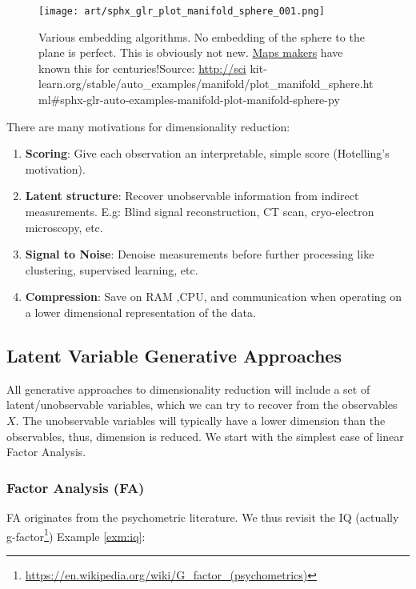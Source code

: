 \documentclass[]{book}
\theoremstyle{definition}
\theoremstyle{definition}
\theoremstyle{definition}
\theoremstyle{remark}
\begin{document}
\begin{figure}
\centering
\texttt{[image: art/sphx\_glr\_plot\_manifold\_sphere\_001.png]}
\caption{Various embedding algorithms. No embedding of the sphere to the
plane is perfect. This is obviously not new.
\href{https://en.wikipedia.org/wiki/Map_projection}{Maps makers} have
known this for centuries!Source: \url{http://sci}
kit-learn.org/stable/auto\_examples/manifold/plot\_manifold\_sphere.html\#sphx-glr-auto-examples-manifold-plot-manifold-sphere-py}
\end{figure}

There are many motivations for dimensionality reduction:

\begin{enumerate}
\def\labelenumi{\arabic{enumi}.}
\item
  \textbf{Scoring}: Give each observation an interpretable, simple score
  (Hotelling's motivation).
\item
  \textbf{Latent structure}: Recover unobservable information from
  indirect measurements. E.g: Blind signal reconstruction, CT scan,
  cryo-electron microscopy, etc.
\item
  \textbf{Signal to Noise}: Denoise measurements before further
  processing like clustering, supervised learning, etc.
\item
  \textbf{Compression}: Save on RAM ,CPU, and communication when
  operating on a lower dimensional representation of the data.
\end{enumerate}

\subsection{Latent Variable Generative
Approaches}\label{latent-variable-generative-approaches}

All generative approaches to dimensionality reduction will include a set
of latent/unobservable variables, which we can try to recover from the
observables \(X\). The unobservable variables will typically have a
lower dimension than the observables, thus, dimension is reduced. We
start with the simplest case of linear Factor Analysis.

\subsubsection{Factor Analysis (FA)}\label{factor-analysis-fa}

FA originates from the psychometric literature. We thus revisit the IQ
(actually g-factor\footnote{\url{https://en.wikipedia.org/wiki/G_factor_(psychometrics)}})
Example \ref{exm:iq}:
\end{document}
